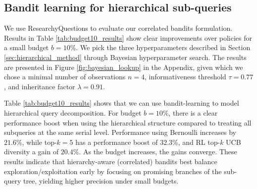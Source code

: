 \subsection{Bandit learning for hierarchical sub-queries}\label{section:researchy_correlated}

We use ResearchyQuestions to evaluate our correlated bandits formulation. Results in Table \ref{tab:budget10_results} show clear improvements over policies for a small budget \(b = 10\%\). 
We pick the three hyperparameters described in Section \ref{sec:hierarchical_method} through Bayesian hyperparameter search. The results are presented in Figure \ref{fig:bayesian_lookup} in the Appendix, given which we chose a minimal number of observations \(n=4\), informativeness threshold \(\tau=0.77\), and inheritance factor \(\lambda=0.91\).

Table \ref{tab:budget10_results} shows that we can use bandit-learning to model hierarchical query decomposition. For budget \(b=10\%\), there is a clear performance boost when using the hierarchical structure compared to treating all subqueries at the same serial level. 
Performance using Bernoulli increases by \(21.6\%\), while top-\(k=5\) has a performance boost of \(32.3\%\), and RL top-\(k\) UCB diversity a gain of \(20.4\%\). As the budget increases, the gains converge. These results indicate that hierarchy-aware (correlated) bandits best balance exploration/exploitation early by focusing on promising branches of the sub-query tree, yielding higher precision under small budgets.





